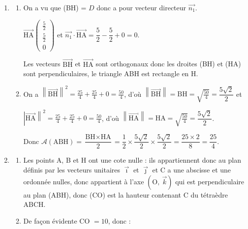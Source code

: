 \documentclass[10pt]{article}
\providecommand{\vect}[1]{\overrightarrow{#1}}
\begin{document}
\begin{enumerate}
\begin{enumerate}
Donc H$\left(\dfrac52~;~\dfrac52~;~0\right)$.
		\item On a $M(x~;~y~;~z) \in D \iff \left\{\begin{array}{l c l}
x&=&0 + \frac52 t\\
y &=&5 - \frac52 t\\
z&=&0 + 0t
\end{array}\right.$

On reconnait dans les coefficients de $t$ les coordonnées du vecteur $\begin{pmatrix}\frac52\\- \frac52\\0\end{pmatrix}$, soit $\frac52\vect{n_1}$ et (0~;~5~;~0) sont les coordonnées de B.

Donc $D$ est la droite contenant B et de vecteur directeur $\vect{n_1}$.

Or on a vu que le vecteur $\vect{n_1}$ est normal au plan (CAD), donc la droite $D$ est perpendiculaire à (CAD) au point H.
	\end{enumerate}
\item 
	\begin{enumerate}
		\item On a vu que (BH) = $D$ donc a pour vecteur directeur $\vect{n_1}$.
		
$\vect{\text{HA}}\begin{pmatrix}\frac52\\\frac52\\0\end{pmatrix}$ et $\vect{n_1} \cdot \vect{\text{HA}} = \dfrac52 - \dfrac52 + 0 = 0$.
		
Les vecteurs $\vect{\text{BH}}$ et $\vect{\text{HA}}$ sont orthogonaux donc les droites (BH) et (HA) sont perpendiculaires, le triangle ABH est rectangle en H.
		\item On a $\left\|\vect{\text{BH}}\right\|^2 = \frac{25}{4} + \frac{25}{4} + 0 = \frac{50}{4}$, d'où $\left\|\vect{\text{BH}}\right\| = \text{BH} = \sqrt{\frac{50}{4}} = \dfrac{5\sqrt 2}{2}$ et 
		
$\left|\vect{\text{HA}}\right\|^2 = \frac{25}{4} + \frac{25}{4} + 0 = \frac{50}{4}$, d'où $\left\|\vect{\text{HA}}\right\| = \text{HA} = \sqrt{\frac{50}{4}} = \dfrac{5\sqrt 2}{2}$.

Donc $\mathcal{A}(\text{ABH}) = \dfrac{\text{BH} \times \text{HA}}{2} = \dfrac12 \times \dfrac{5\sqrt 2}{2} \times \dfrac{5\sqrt 2}{2} = \dfrac{25 \times 2}{8} = \dfrac{25}{4}$.
	\end{enumerate}
\item 
	\begin{enumerate}
		\item Les points A, B et H ont une cote nulle : ils appartiennent donc au plan définis par les vecteurs unitaires $\vect{\imath}$ et $\vect{\jmath}$ et C a une abscisse et une ordonnée nulles, donc appartient à l'axe $\left(\text{O},~\vect{k}\right)$ qui est perpendiculaire au plan (ABH), donc (CO) est la hauteur contenant C du tétraèdre ABCH.
		\item De façon évidente CO $ = 10$, donc :
		

\end{enumerate}
\end{enumerate}
\end{document}
